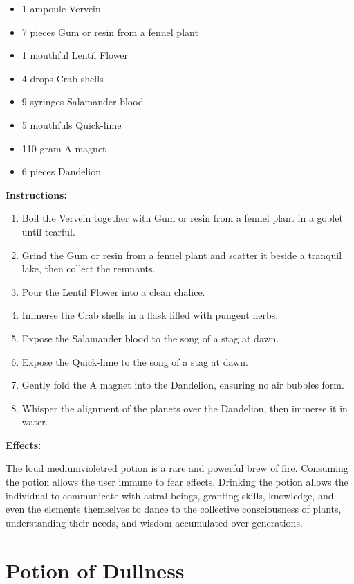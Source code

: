 \documentclass{article}
\begin{document}
\begin{itemize}
  \item 1 ampoule Vervein
  \item 7 pieces Gum or resin from a fennel plant
  \item 1 mouthful Lentil Flower
  \item 4 drops Crab shells
  \item 9 syringes Salamander blood
  \item 5 mouthfuls Quick-lime
  \item 110 gram A magnet
  \item 6 pieces Dandelion
\end{itemize}

\textbf{Instructions:}

\begin{enumerate}
  \item Boil the Vervein together with Gum or resin from a fennel plant in a goblet until tearful.
  \item Grind the Gum or resin from a fennel plant and scatter it beside a tranquil lake, then collect the remnants.
  \item Pour the Lentil Flower into a clean chalice.
  \item Immerse the Crab shells in a flask filled with pungent herbs.
  \item Expose the Salamander blood to the song of a stag at dawn.
  \item Expose the Quick-lime to the song of a stag at dawn.
  \item Gently fold the A magnet into the Dandelion, ensuring no air bubbles form.
  \item Whisper the alignment of the planets over the Dandelion, then immerse it in water.
\end{enumerate}

\textbf{Effects:}

The loud mediumvioletred potion is a rare and powerful brew of fire. Consuming the potion allows the user immune to fear effects. Drinking the potion allows the individual to communicate with astral beings, granting skills, knowledge, and even the elements themselves to dance to the collective consciousness of plants, understanding their needs, and wisdom accumulated over generations.

\newpage
\section*{Potion of Dullness}
\end{document}

